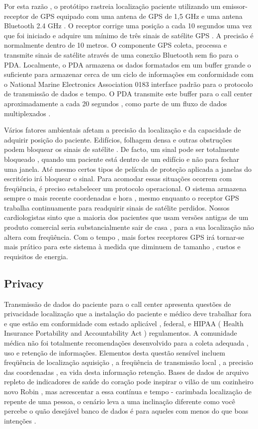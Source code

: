 \documentclass[a4paper,12pt]{article}
\begin{document}
Por esta razão , o protótipo rastreia localização paciente utilizando um emissor-receptor de GPS equipado com uma antena de GPS de 1,5 GHz e uma antena Bluetooth 2.4 GHz . O receptor corrige uma posição a cada 10 segundos uma vez que foi iniciado e adquire um mínimo de três sinais de satélite GPS . A precisão é normalmente dentro de 10 metros. O componente GPS coleta, processa e transmite sinais de satélite através de uma conexão Bluetooth sem fio para o PDA. Localmente, o PDA armazena os dados formatados em um buffer grande o suficiente para armazenar cerca de um ciclo de informações em conformidade com o National Marine Electronics Association 0183 interface padrão para o protocolo de transmissão de dados e tempo. O PDA transmite este buffer para o call center aproximadamente a cada 20 segundos , como parte de um fluxo de dados multiplexados .

Vários fatores ambientais afetam a precisão da localização e da capacidade de adquirir posição do paciente. Edifícios, folhagem densa e outras obstruções podem bloquear os sinais de satélite . De facto, um sinal pode ser totalmente bloqueado , quando um paciente está dentro de um edifício e não para fechar uma janela. Até mesmo certos tipos de película de proteção aplicada a janelas do escritório irá bloquear o sinal. Para acomodar essas situações ocorrem com freqüência, é preciso estabelecer um protocolo operacional. O sistema armazena sempre o mais recente coordenadas e hora , mesmo enquanto o receptor GPS trabalha continuamente para readquirir sinais de satélite perdidos. Nossos cardiologistas sinto que a maioria dos pacientes que usam versões antigas de um produto comercial seria substancialmente sair de casa , para a sua localização não altera com freqüência. Com o tempo , mais fortes receptores GPS irá tornar-se mais prático para este sistema à medida que diminuem de tamanho , custos e requisitos de energia.


\subsection{Privacy}

Transmissão de dados do paciente para o call center apresenta questões de privacidade localização que a instalação do paciente e médico deve trabalhar fora e que estão em conformidade com estado aplicável , federal, e HIPAA ( Health Insurance Portability and Accountability Act ) regulamentos. A comunidade médica não foi totalmente recomendações desenvolvido para a coleta adequada , uso e retenção de informações. Elementos desta questão sensível incluem freqüência de localização aquisição , a freqüência de transmissão local , a precisão das coordenadas , ea vida desta informação retenção. Bases de dados de arquivo repleto de indicadores de saúde do coração pode inspirar o vilão de um cozinheiro novo Robin , mas acrescentar a essa contínua e tempo - carimbada localização de repente de uma pessoa, o cenário leva a uma inclinação diferente como você percebe o quão desejável banco de dados é para aqueles com menos do que boas intenções .
\end{document}
